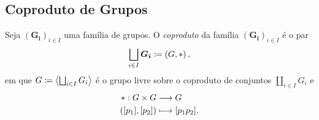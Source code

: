 \subsection{Coproduto de Grupos}

\begin{defi}
Seja $(\bm{G_i})_{i \in I}$ uma família de grupos. O \emph{coproduto} da família $(\bm{G_i})_{i \in I}$ é o par
	\begin{equation*}
	\bigsqcup_{i \in I} \bm{G_i} \coloneqq \left(G,\ast \right),
	\end{equation*}
em que $G \coloneqq \left\langle \bigsqcup_{i \in I} G_i \right\rangle$ é o grupo livre sobre o coproduto de conjuntos $\coprod_{i \in I} G_i$ e
	\begin{align*}
	{\ast}: {G \times G} &\longrightarrow {G} \\{([p_1],[p_2])} &\longmapsto {[p_1p_2]}.
	\end{align*}
\end{defi}

